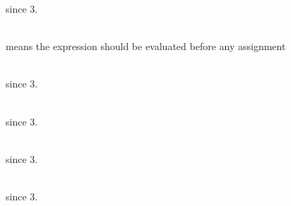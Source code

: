 \begin{DoxyRefList}
\label{deprecated__deprecated000016}%
%
since  3.  
\item[メンバ \doxylink{group__flags_ga0972b20dc004d13984e642b3bd12532e_ga0972b20dc004d13984e642b3bd12532e}{Eigen\+::Eval\+Before\+Assigning\+Bit} ]\hfill \\
\label{deprecated__deprecated000010}%
%
 means the expression should be evaluated before any assignment  
\item[メンバ \doxylink{class_eigen_1_1_generalized_eigen_solver_a04e517142d9c7a83d132757227ca5b1b_a04e517142d9c7a83d132757227ca5b1b}{Eigen\+::Generalized\+Eigen\+Solver\texorpdfstring{$<$}{<} \+\_\+\+Matrix\+Type \texorpdfstring{$>$}{>}\+::Index} ]\hfill \\
\label{deprecated__deprecated000017}%
%
since  3.  
\item[メンバ \doxylink{class_eigen_1_1_hessenberg_decomposition_accc818b46bf76a6817caf1063e0c21b4_accc818b46bf76a6817caf1063e0c21b4}{Eigen\+::Hessenberg\+Decomposition\texorpdfstring{$<$}{<} \+\_\+\+Matrix\+Type \texorpdfstring{$>$}{>}\+::Index} ]\hfill \\
\label{deprecated__deprecated000018}%
%
since  3.  
\item[メンバ \doxylink{class_eigen_1_1_hyperplane_ab74de60d4d2462285e1b67a76ef055af_ab74de60d4d2462285e1b67a76ef055af}{Eigen\+::Hyperplane\texorpdfstring{$<$}{<} \+\_\+\+Scalar, \+\_\+\+Ambient\+Dim, \+\_\+\+Options \texorpdfstring{$>$}{>}\+::Index} ]\hfill \\
\label{deprecated__deprecated000026}%
%
since  3.  
\item[メンバ \doxylink{class_eigen_1_1internal_1_1_upper_bidiagonalization_a3c587dd4e2d1d3d4d91aba36d18564ab_a3c587dd4e2d1d3d4d91aba36d18564ab}{Eigen\+::internal\+::Upper\+Bidiagonalization\texorpdfstring{$<$}{<} \+\_\+\+Matrix\+Type \texorpdfstring{$>$}{>}\+::Index} ]\hfill \\
\label{deprecated__deprecated000037}%
%
since  3.  
\item[Class \doxylink{class_eigen_1_1_mapped_sparse_matrix}{Eigen\+::Mapped\+Sparse\+Matrix\texorpdfstring{$<$}{<} \+\_\+\+Scalar, \+\_\+\+Flags, \+\_\+\+Storage\+Index \texorpdfstring{$>$}{>}} ]\hfill \\

\end{DoxyRefList}
